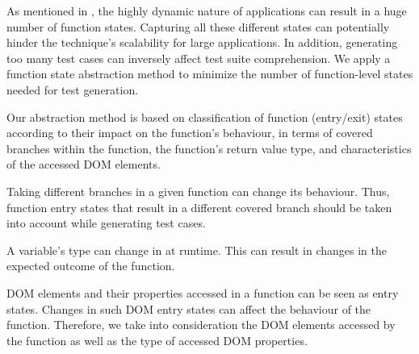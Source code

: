 As mentioned in , the highly dynamic nature of \javascript applications can result in a huge number of function states. Capturing all these different states can potentially hinder the technique's scalability for large applications. In addition, generating too many test cases can inversely affect test suite comprehension.
We apply a function state abstraction method to minimize the number of function-level states needed for test generation.



Our abstraction method is based on classification of function (entry/exit) states according to their impact on the function's behaviour, in terms of covered branches within the function, the function's return value type, and characteristics of the accessed DOM elements.

\begin{description}[noitemsep, leftmargin=0.4cm]
\item[Branch coverage:] Taking different branches in a given function can change its behaviour. Thus, function entry states that result in a different covered branch should be taken into account while generating test cases.    

\item[Return value type:] A variable's type can change in \javascript at runtime. This can result in changes in the expected outcome of the function.

\item[Accessed DOM properties:] DOM elements and their properties accessed in a function can be seen as entry states. Changes in such DOM entry states can affect the behaviour of the function.
Therefore, we take into consideration the DOM elements accessed by the function as well as the type of accessed DOM properties.

\end{description}

